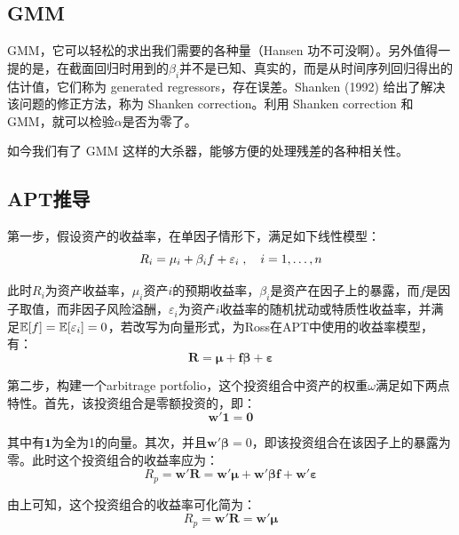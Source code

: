 \documentclass[11pt]{article}
\begin{document}
\subsection{GMM}

GMM，它可以轻松的求出我们需要的各种量（Hansen 功不可没啊）。另外值得一提的是，在截面回归时用到的$\beta_i$并不是已知、真实的，而是从时间序列回归得出的估计值，它们称为 generated regressors，存在误差。Shanken (1992) 给出了解决该问题的修正方法，称为 Shanken correction。利用 Shanken correction 和 GMM，就可以检验$\alpha$是否为零了。

如今我们有了 GMM 这样的大杀器，能够方便的处理残差的各种相关性。

\appendix

\begin{appendices}

\section{APT推导}

第一步，假设资产的收益率，在单因子情形下，满足如下线性模型：
\begin{equation*}
    R_i = \mu_i + \beta_i f + \varepsilon_i \;,\quad i =1,\dots,n
\end{equation*}

此时$R_i$为资产收益率，$\mu_i$资产$i$的预期收益率，$\beta_i$是资产在因子上的暴露，而$f$是因子取值，而非因子风险溢酬，$\varepsilon_i$为资产$i$收益率的随机扰动或特质性收益率，并满足$\mathbb{E}[f]=\mathbb{E}[\varepsilon_i]=0$，若改写为向量形式，为Ross在APT中使用的收益率模型，有：
\begin{equation*}
    \bm{R} = \bm{\mu + f\beta + \varepsilon}
\end{equation*}

第二步，构建一个arbitrage portfolio，这个投资组合中资产的权重$\omega$满足如下两点特性。首先，该投资组合是零额投资的，即：
\begin{equation*}
    \bm{w' 1 = 0}
\end{equation*}

其中有$\bm{1}$为全为1的向量。其次，并且$\bm{w'\beta}=0$，即该投资组合在该因子上的暴露为零。此时这个投资组合的收益率应为：
\begin{equation*}
    R_p = \bm{w'R = w'\mu + w'\beta f + w'\varepsilon}
\end{equation*}

由上可知，这个投资组合的收益率可化简为：
\begin{equation*}
    R_p = \bm{w'R = w'\mu} 
\end{equation*}


\end{appendices}
\end{document}
